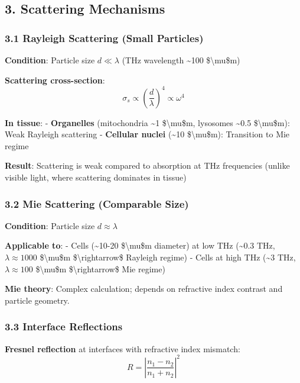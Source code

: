 \subsection{3. Scattering Mechanisms}\label{scattering-mechanisms}

\subsubsection{3.1 Rayleigh Scattering (Small
Particles)}\label{rayleigh-scattering-small-particles}

\textbf{Condition}: Particle size \(d \ll \lambda\) (THz wavelength
\textasciitilde100 \$\textbackslash mu\$m)

\textbf{Scattering cross-section}:
\[\sigma_s \propto \left(\frac{d}{\lambda}\right)^4 \propto \omega^4\]

\textbf{In tissue}: - \textbf{Organelles} (mitochondria \textasciitilde1
\$\textbackslash mu\$m, lysosomes \textasciitilde0.5
\$\textbackslash mu\$m): Weak Rayleigh scattering - \textbf{Cellular
nuclei} (\textasciitilde10 \$\textbackslash mu\$m): Transition to Mie
regime

\textbf{Result}: Scattering is weak compared to absorption at THz
frequencies (unlike visible light, where scattering dominates in tissue)

\subsubsection{3.2 Mie Scattering (Comparable
Size)}\label{mie-scattering-comparable-size}

\textbf{Condition}: Particle size \(d \approx \lambda\)

\textbf{Applicable to}: - Cells (\textasciitilde10-20
\$\textbackslash mu\$m diameter) at low THz (\textasciitilde0.3 THz,
\(\lambda \approx 1000\) \$\textbackslash mu\$m
\$\textbackslash rightarrow\$ Rayleigh regime) - Cells at high THz
(\textasciitilde3 THz, \(\lambda \approx 100\) \$\textbackslash mu\$m
\$\textbackslash rightarrow\$ Mie regime)

\textbf{Mie theory}: Complex calculation; depends on refractive index
contrast and particle geometry.

\subsubsection{3.3 Interface Reflections}\label{interface-reflections}

\textbf{Fresnel reflection} at interfaces with refractive index
mismatch: \[R = \left| \frac{n_1 - n_2}{n_1 + n_2} \right|^2\]

